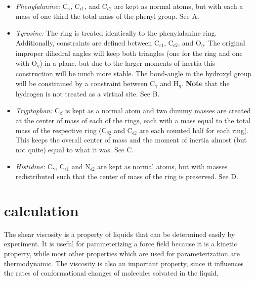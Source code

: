\begin{itemize}

\item{\em Phenylalanine:\/} {\sf C}$_\gamma$, {\sf C}$_{{\epsilon}1}$,
and {\sf C}$_{{\epsilon}2}$ are kept as normal atoms, but with each a
mass of one third the total mass of the phenyl group. See
A.

\item{\em Tyrosine:\/} The ring is treated identically to the
phenylalanine ring. Additionally, constraints are defined between {\sf
C}$_{{\epsilon}1}$, {\sf C}$_{{\epsilon}2}$, and {\sf O}$_{\eta}$.
The original improper dihedral angles will keep both triangles (one
for the ring and one with {\sf O}$_{\eta}$) in a plane, but due to the
larger moments of inertia this construction will be much more
stable. The bond-angle in the hydroxyl group will be constrained by a
constraint between {\sf C}$_\gamma$ and {\sf H}$_{\eta}$. {\bf Note} that
the hydrogen is not treated as a virtual site. See
B.

\item{\em Tryptophan:\/} {\sf C}$_\beta$ is kept as a normal atom
and two dummy masses are created at the center of mass of each of the
rings, each with a mass equal to the total mass of the respective ring
({\sf C}$_{{\delta}2}$ and {\sf C}$_{{\epsilon}2}$ are each
counted half for each ring). This keeps the overall center of mass and
the moment of inertia almost (but not quite) equal to what it was. See
C.

\item{\em Histidine:\/} {\sf C}$_\gamma$, {\sf C}$_{{\epsilon}1}$
and {\sf N}$_{{\epsilon}2}$ are kept as normal atoms, but with masses
redistributed such that the center of mass of the ring is
preserved. See D.

\end{itemize}

\section{ calculation}

The shear viscosity is a property of liquids that can be determined easily  
by experiment. It is useful for parameterizing a force field
because it is a kinetic property, while most other properties
which are used for parameterization are thermodynamic.
The viscosity is also an important property, since it influences
the rates of conformational changes of molecules solvated in the liquid.

